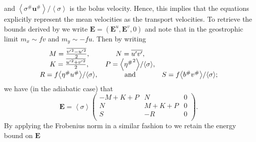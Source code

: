 \documentclass[12pt,a4paper]{report}
\newcommand*\thkmean[1]{\overline{#1}}
\newcommand*\thkres[1]{{#1}^{\prime}}
\newcommand*\nthkmean[1]{\left\langle{#1}\right\rangle}
\newcommand*\nthkres[1]{{#1}^{\#}}
\begin{document}
                   and  $\nthkmean{\nthkres{\sigma}\nthkres{\boldsymbol{u}}}/\nthkmean{\sigma}$
                   is the bolus velocity. Hence, this implies that  the equations explicitly
                    represent the mean velocities as the  transport velocities.
                     To retrieve the bounds derived by \cite{marshall2012framework} 
                     we write $\boldsymbol{E} = (\boldsymbol{E}^{u}, \boldsymbol{E}^{v}, 0)$
                     and note that in the geostrophic limit $m_x \sim fv$ and  $m_y \sim -fu$.
                     Then by writing 
                     \begin{equation}
                     \begin{array}{ccc}
                     M = \frac{\thkmean{{\thkres{v}}^{2} - {\thkres{u}}^{2}}}{2}, & 
                     N = \thkmean{\thkres{u}\thkres{v} }, \\
                     K = \frac{\thkmean{{\thkres{u}}^{2} + {\thkres{v}}^{2}}}{2}, & 
                     P =  {\nthkmean{{\nthkres{\eta}}^{2}}}/{\nthkmean{\sigma}},  \\ 
                     R =  f{\nthkmean{\nthkres{\eta}\nthkres{u}}}/{\nthkmean{\sigma}}, \, & \rm and  &  
                     S = f{\nthkmean{\nthkres{b}\nthkres{v}}}/{\nthkmean{\sigma}} ;
                     \end{array} 
                     \end{equation}
                     we have (in the adiabatic case) that
                     \begin{equation}
                     \boldsymbol{E}=\nthkmean{\sigma}\left(
                     \begin{array}{ccc}
                     -M+K+P & N & 0 \\
                     N & M+K+P & 0 \\
                     S & -R & 0 \\
                     \end{array}\right).
                     \end{equation}
                     By applying the Frobenius norm in a similar fashion to 
                     \cite{marshall2012framework} we retain the energy bound on
                      $\boldsymbol{E}$
                      
\end{document}

